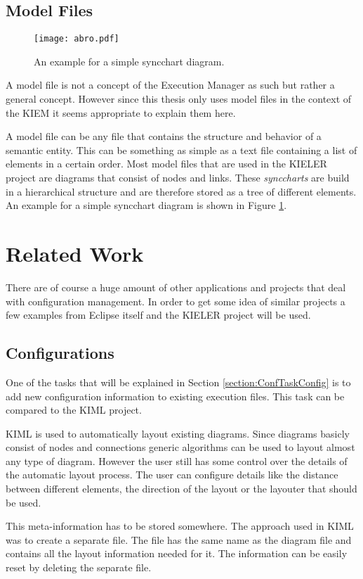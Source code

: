 \subsection{Model Files}
\label{section:IntroModelFile}
\begin{figure}
  \centering
  \texttt{[image: abro.pdf]}
  \caption[An example for a simple syncchart diagram.]%
  {An example for a simple syncchart diagram.\protect}
  \label{fig:abro}
\end{figure}
A model file is not a concept of the Execution Manager as such but rather a general concept. However
since this thesis only uses model files in the context of the \ac{KIEM} it seems appropriate to explain
them here.

A model file can be any file that contains the structure and behavior of a semantic entity. This can be something as
simple as a text file containing a list of elements in a certain order. Most model files that are used in
the \ac{KIELER} project are diagrams that consist of nodes and links. These \textit{synccharts} are build in
a hierarchical structure and are therefore stored as a tree of different elements. An example for a simple
syncchart diagram is shown in Figure \ref{fig:abro}.

\section{Related Work}
\label{section:RelatedWork}
There are of course a huge amount of other applications and projects that deal
with configuration management. In order to get some idea of similar projects
a few examples from Eclipse itself and the \ac{KIELER} project will be used.

\subsection{Configurations}
\label{section:RelatedConf}
One of the tasks that will be explained in Section \ref{section:ConfTaskConfig} is to add new
configuration information to existing execution files. This task can be compared to
the \ac{KIML} project. 

\ac{KIML} is used to automatically layout existing diagrams. Since diagrams basicly consist of nodes and
connections generic algorithms can be used to layout almost any type of diagram. However the user still
has some control over the details of the automatic layout process. The user can configure details like
the distance between different elements, the direction of the layout or the layouter that should be used.

This meta-information has to be stored somewhere. The approach used in \ac{KIML} was to create a separate
file. The file has the same name as the diagram file and contains all the layout information needed for it.
The information can be easily reset by deleting the separate file. 
